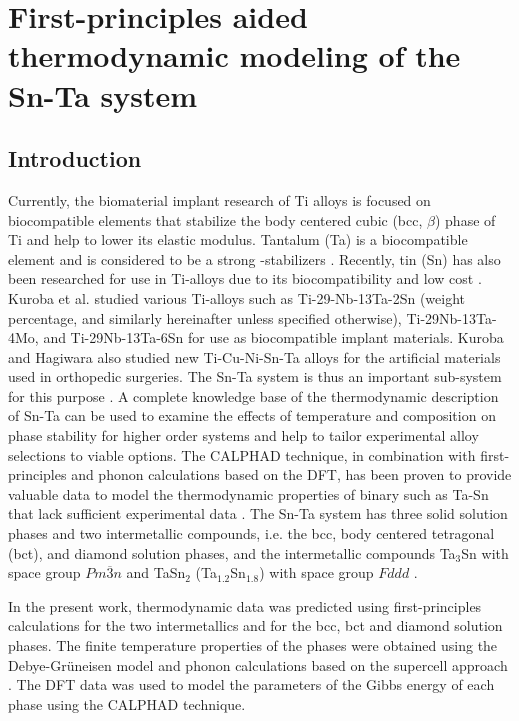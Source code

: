 \chapter{First-principles aided thermodynamic modeling of the Sn-Ta system}

\section{Introduction}

Currently, the biomaterial implant research of Ti alloys is focused on biocompatible elements that stabilize the body centered cubic (bcc, $\beta$) phase of Ti and help to lower its elastic modulus. Tantalum (Ta) is a biocompatible element and is considered to be a strong -stabilizers \cite{Brailovski2011b}. Recently, tin (Sn) has also been researched for use in Ti-alloys due to its biocompatibility and low cost \cite{Niinomi2012}. Kuroba et al. \cite{Kuroda1998} studied various Ti-alloys such as Ti-29-Nb-13Ta-2Sn (weight percentage, and similarly hereinafter unless specified otherwise), Ti-29Nb-13Ta-4Mo, and Ti-29Nb-13Ta-6Sn for use as biocompatible implant materials. Kuroba and Hagiwara \cite{He2004} also studied new Ti-Cu-Ni-Sn-Ta alloys for the artificial materials used in orthopedic surgeries. The Sn-Ta system is thus an important sub-system for this purpose \cite{He2006}.  A complete knowledge base of the thermodynamic description of Sn-Ta can be used to examine the effects of temperature and composition on phase stability for higher order systems and help to tailor experimental alloy selections to viable options. The CALPHAD technique, in combination with first-principles and phonon calculations based on the DFT, has been proven to provide valuable data to model the thermodynamic properties of binary such as Ta-Sn that lack sufficient experimental data \cite{Liu2009}. The Sn-Ta system has three solid solution phases and two intermetallic compounds, i.e. the bcc, body centered tetragonal (bct), and diamond solution phases, and the intermetallic compounds Ta$_{3}$Sn with space group $Pm\overline{3}n$ and TaSn$_{2}$ (Ta$_{1.2}$Sn$_{1.8}$) with space group $Fddd$ \cite{Okamoto2003}.

 In the present work, thermodynamic data was predicted using first-principles calculations for the two intermetallics and for the bcc, bct and diamond solution phases. The finite temperature properties of the phases were obtained using the Debye-Gr\"uneisen model \cite{Shang2010} and phonon calculations based on the supercell approach \cite{Wang2012}.  The DFT data was used to model the parameters of the Gibbs energy of each phase using the CALPHAD technique.

